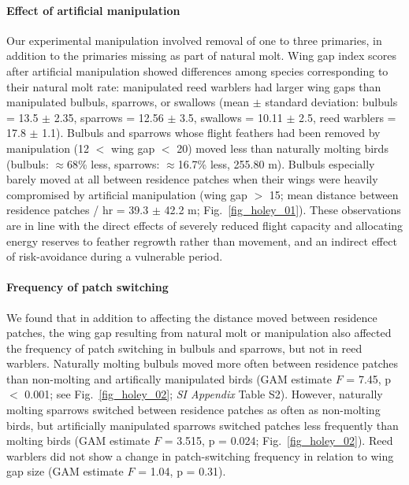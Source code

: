 \begin{refsection}
\paragraph*{Effect of artificial manipulation}

Our experimental manipulation involved removal of one to three primaries, in addition to the primaries missing as part of natural molt.
Wing gap index scores after artificial manipulation showed differences among species corresponding to their natural molt rate: manipulated reed warblers had larger wing gaps than manipulated bulbuls, sparrows, or swallows {(mean $\pm$ standard deviation: bulbuls = 13.5 $\pm$ 2.35, sparrows = 12.56 $\pm$ 3.5, swallows = 10.11 $\pm$ 2.5, reed warblers = 17.8 $\pm$ 1.1).}
Bulbuls and sparrows whose flight feathers had been removed by manipulation (12 $<$ wing gap $<$ 20) moved less than naturally molting birds {(bulbuls: $\approx$68\% less, sparrows: $\approx$16.7\% less, 255.80 m)}.
Bulbuls especially barely moved at all between residence patches when their wings were heavily compromised by artificial manipulation (wing gap $>$ 15; mean distance between residence patches / hr = 39.3 $\pm$ 42.2 m; Fig.~\ref{fig_holey_01}).
These observations are in line with the direct effects of severely reduced flight capacity and allocating energy reserves to feather regrowth rather than movement, and an indirect effect of risk-avoidance during a vulnerable period.

\paragraph*{Frequency of patch switching}

We found that in addition to affecting the distance moved between residence patches, the wing gap resulting from natural molt or manipulation also affected the frequency of patch switching in bulbuls and sparrows, but not in reed warblers.
Naturally molting bulbuls moved more often between residence patches than non-molting and artifically manipulated birds (GAM estimate $F$ = 7.45, p $<$ 0.001; see Fig.~\ref{fig_holey_02}; \textit{SI Appendix} Table S2).
However, naturally molting sparrows switched between residence patches as often as non-molting birds, but artificially manipulated sparrows switched patches less frequently than molting birds (GAM estimate $F$ = 3.515, p = 0.024; Fig.~\ref{fig_holey_02}).
Reed warblers did not show a change in patch-switching frequency in relation to wing gap size (GAM estimate $F$ = 1.04, p = 0.31).


\end{refsection}
